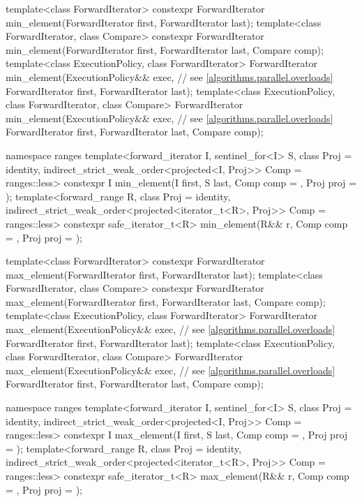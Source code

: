 \begin{codeblock}
{  template<class ForwardIterator>
    constexpr ForwardIterator min_element(ForwardIterator first, ForwardIterator last);
  template<class ForwardIterator, class Compare>
    constexpr ForwardIterator min_element(ForwardIterator first, ForwardIterator last,
                                          Compare comp);
  template<class ExecutionPolicy, class ForwardIterator>
    ForwardIterator min_element(ExecutionPolicy&& exec,         // see \ref{algorithms.parallel.overloads}
                                ForwardIterator first, ForwardIterator last);
  template<class ExecutionPolicy, class ForwardIterator, class Compare>
    ForwardIterator min_element(ExecutionPolicy&& exec,         // see \ref{algorithms.parallel.overloads}
                                ForwardIterator first, ForwardIterator last,
                                Compare comp);

  namespace ranges {
    template<forward_iterator I, sentinel_for<I> S, class Proj = identity,
             indirect_strict_weak_order<projected<I, Proj>> Comp = ranges::less>
      constexpr I min_element(I first, S last, Comp comp = {}, Proj proj = {});
    template<forward_range R, class Proj = identity,
             indirect_strict_weak_order<projected<iterator_t<R>, Proj>> Comp = ranges::less>
      constexpr safe_iterator_t<R>
        min_element(R&& r, Comp comp = {}, Proj proj = {});
  }

  template<class ForwardIterator>
    constexpr ForwardIterator max_element(ForwardIterator first, ForwardIterator last);
  template<class ForwardIterator, class Compare>
    constexpr ForwardIterator max_element(ForwardIterator first, ForwardIterator last,
                                          Compare comp);
  template<class ExecutionPolicy, class ForwardIterator>
    ForwardIterator max_element(ExecutionPolicy&& exec,         // see \ref{algorithms.parallel.overloads}
                                ForwardIterator first, ForwardIterator last);
  template<class ExecutionPolicy, class ForwardIterator, class Compare>
    ForwardIterator max_element(ExecutionPolicy&& exec,         // see \ref{algorithms.parallel.overloads}
                                ForwardIterator first, ForwardIterator last,
                                Compare comp);

 namespace ranges {
    template<forward_iterator I, sentinel_for<I> S, class Proj = identity,
             indirect_strict_weak_order<projected<I, Proj>> Comp = ranges::less>
      constexpr I max_element(I first, S last, Comp comp = {}, Proj proj = {});
    template<forward_range R, class Proj = identity,
             indirect_strict_weak_order<projected<iterator_t<R>, Proj>> Comp = ranges::less>
      constexpr safe_iterator_t<R>
        max_element(R&& r, Comp comp = {}, Proj proj = {});
  }

}
\end{codeblock}
